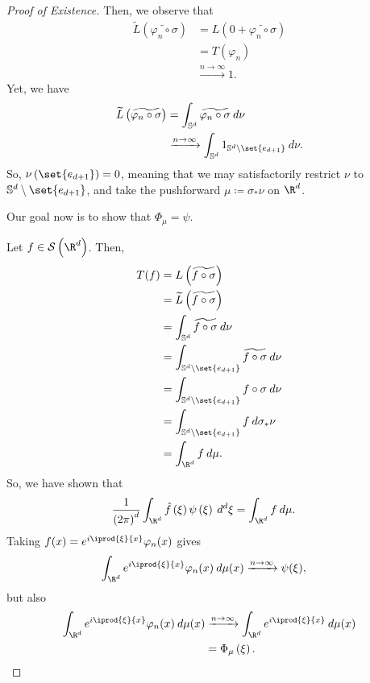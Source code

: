 \documentclass[10pt]{mypackage}
\renewcommand{\coloneq}{\coloneqq}
\begin{document}
\begin{proof}[Proof of Existence]
  Then, we observe that
  \begin{align*}
    \widetilde{L}\left( \widetilde{\varphi_n\circ\sigma} \right) &= L\left( 0 + \widetilde{\varphi_n\circ\sigma} \right)\\
                                                                 &= T\left( \varphi_n \right)\\
                                                                 &\xrightarrow{n\to\infty} 1.
  \end{align*}
  Yet, we have
  \begin{align*}
    \widetilde{L}\left( \widetilde{\varphi_n\circ\sigma} \right) &= \int_{ \mathbb{S}^d }^{} \widetilde{\varphi_n\circ\sigma}\:d\nu\\
                                                                 &\xrightarrow{n\to\infty} \int_{ \mathbb{S}^d }^{} 1_{ \mathbb{S}^d\setminus\set{e_{d+1}} }\:d\nu.
  \end{align*}
  So, $\nu\left( \set{e_{d+1}} \right) = 0$, meaning that we may satisfactorily restrict $\nu$ to $ \mathbb{S}^d\setminus \set{e_{d+1}}$, and take the pushforward $\mu\coloneq \sigma_{\ast}\nu$ on $\R^d$.

  Our goal now is to show that $\Phi_{\mu} = \psi$.

  Let $f\in \mathcal{S}\left( \R^d \right)$. Then,
  \begin{align*}
    T(f) &= L\left( \widetilde{f\circ\sigma} \right)\\
         &= \widetilde{L}\left( \widetilde{f\circ\sigma} \right)\\
         &= \int_{ \mathbb{S}^d }^{} \widetilde{f\circ\sigma}\:d\nu\\
         &= \int_{ \mathbb{S}^{d}\setminus \set{e_{d+1}} }^{} \widetilde{f\circ\sigma}\:d\nu\\
         &= \int_{ \mathbb{S}^{d}\setminus \set{e_{d+1}} }^{} f\circ\sigma\:d\nu\\
         &= \int_{ \mathbb{S}^{d}\setminus \set{e_{d+1}} }^{} f\:d\sigma_{\ast}\nu\\
         &= \int_{ \R^d }^{} f\:d\mu.
  \end{align*}
  So, we have shown that
  \begin{align*}
    \frac{1}{\left( 2\pi \right)^{d}}\int_{\R^d}^{} \hat{f}\left( \xi \right)\psi\left( \xi \right)\:d^{d}\xi &= \int_{\R^d}^{} f\:d\mu.
  \end{align*}
  Taking $f(x) = e^{i \iprod{\xi}{x}}\varphi_n(x)$ gives
  \begin{align*}
    \int_{\R^d}^{} e^{i \iprod{\xi}{x}}\varphi_n(x)\:d\mu(x) &\xrightarrow{n\to\infty} \psi(\xi),
  \end{align*}
  but also
  \begin{align*}
    \int_{\R^d}^{} e^{i \iprod{\xi}{x}}\varphi_n(x)\:d\mu(x) &\xrightarrow{n\to\infty} \int_{\R^d}^{} e^{i \iprod{\xi}{x}}\:d\mu(x)\\
                                                             &= \Phi_{\mu}\left(\xi\right).
  \end{align*}
\end{proof}
\end{document}
